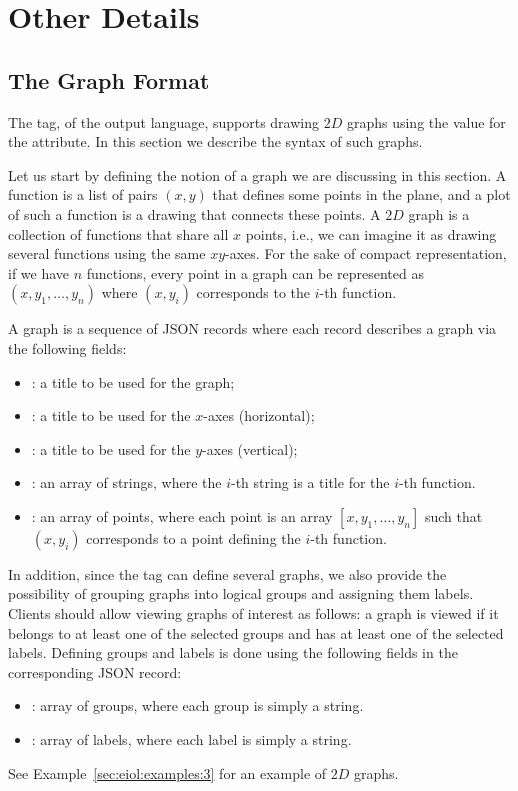 \section{Other Details}
\label{sec:eiol:other}

\subsection{The Graph Format}
\label{sec:eiol:other:graph}

The  tag, of the \ei output language,
supports drawing $2D$ graphs using the value 
for the  attribute. In this section we describe
the syntax of such graphs.

Let us start by defining the notion of a graph we are discussing in
this section.  A function is a list of pairs $(x,y)$ that defines some
points in the plane, and a plot of such a function is a drawing that
connects these points.
%
A $2D$ graph is a collection of functions that share all $x$ points,
i.e., we can imagine it as drawing several functions using the same
$xy$-axes.
%
For the sake of compact representation, if we have $n$ functions,
every point in a graph can be represented as $(x,y_1,\ldots,y_n)$
where $(x,y_i)$ corresponds to the $i$-th function.

A graph is a sequence of JSON records where each record describes a
graph via the following fields:
%
\begin{itemize}
\item {}: a title to be used for the graph;
%
\item {}: a title to be used for the $x$-axes
  (horizontal);
%
\item {}: a title to be used for the $y$-axes
  (vertical);
%
\item {}: an array of strings, where the $i$-th
  string is a title for the $i$-th function.
%
\item {}: an array of points, where each point is
  an array $[x,y_1,\ldots,y_n]$ such that $(x,y_i)$ corresponds to a
  point defining the $i$-th function.
%
\end{itemize}
%
In addition, since the  tag can define
several graphs, we also provide the possibility of grouping graphs
into logical groups and assigning them labels.
%
Clients should allow viewing graphs of interest as follows: a graph is
viewed if it belongs to at least one of the selected groups and has at
least one of the selected labels. 
%
Defining groups and labels is done using the following fields in the
corresponding JSON record:
%
\begin{itemize}
\item {}: array of groups, where each group is
  simply a string.
\item {}: array of labels, where each label is
  simply a string.
\end{itemize}
%
See Example~\ref{sec:eiol:examples:3} for an example of $2D$ graphs.


